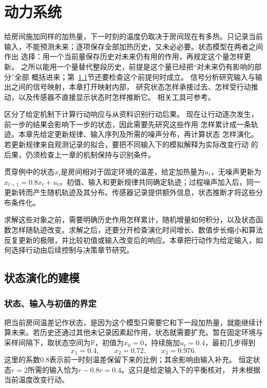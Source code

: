 \chapter{动力系统}
\label{chap:dynamical-systems-and-state-estimation}
\label{chap:action-and-state}

给房间施加同样的加热量，下一时刻的温度仍取决于房间现在有多热。只记录当前
输入，不能预测未来；逐项保存全部加热历史，又未必必要。状态模型在两者之间作出
选择：用一个当前量保存历史对未来仍有用的作用，再规定这个量怎样更新。
之所以能用一个量替代整段历史，前提是这个量已经把“对未来仍有影响的部分”全部
概括进来；第~\ref{sec:dynamical-difference-ode}节还要检查这个前提何时成立。
信号分析研究输入与输出之间的信号映射，本章打开映射内部，
研究状态怎样承接过去、怎样受行动推动，以及传感器不直接显示状态时怎样推断它。
相关工具可参考。

区分了给定机制下计算行动响应与从资料识别行动后果。
现在让行动逐次发生，前一步的结果会影响下一步的状态，因此需要先研究这些作用
怎样累计成一条轨迹。本章先给定更新规律、输入序列及所需的噪声分布，再计算状态
怎样演化。若更新规律来自观测记录的拟合，要把不同输入下的模拟解释为实际改变行动
的后果，仍须检查上一章的机制保持与识别条件。

贯穿例中的状态\(x_t\)是房间相对于固定环境的温差，给定加热量为\(u_t\)，无噪声更新为\(x_{t+1}=0.8x_t+u_t\)。初值、输入和更新规律共同确定轨迹；过程噪声加入后，同一更新转而产生随机轨迹及其分布。传感器记录提供额外信息，状态推断才将这些分布条件化。

求解这些对象之前，需要明确历史作用怎样累计，随机增量如何积分，以及状态函数怎样随轨迹改变。求解之后，还要分开检查演化时间增长、数值步长缩小和算法反复更新的极限，并比较初值或输入改变后的响应。本章把行动作为给定输入，如何选择行动由后续控制与决策章节研究。

\section{状态演化的建模}
\label{sec:dynamical-difference-ode}

\subsection{状态、输入与初值的界定}
把当前房间温差记作状态，是因为这个模型只需要它和下一段加热量，就能继续计算未来。若历史还通过其他未记录因素起作用，状态就需要扩充。暂在固定环境与采样间隔下，取状态空间为$\mathbb R$，初值为$x_0=0$，持续施加$u_t=0.4$，最初几步得到
\[
  x_1=0.4,\qquad x_2=0.72,\qquad x_3=0.976.
\]
这里的系数$0.8$表示前一时刻温差保留下来的比例；其余影响由输入补充。
恒定状态$r=2$所需的输入恰为$r-0.8r=0.4$。这只是给定输入下的平衡核对，
并未根据当前温度改变行动。

